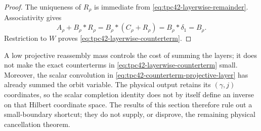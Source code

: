\begin{proof}
The uniqueness of \(R_\rho\) is immediate from
\eqref{eq:tpc42-layerwise-remainder}.  Associativity gives
\[
 A_\rho+B_\rho*R_\rho
 =B_\rho*(C_\rho+R_\rho)
 =B_\rho*\delta_1
 =B_\rho.
\]
Restriction to \(W\) proves
\eqref{eq:tpc42-layerwise-counterterm}.
\end{proof}

A low projective reassembly mass controls the cost of summing the layers;
it does not make the exact counterterms in
\eqref{eq:tpc42-layerwise-counterterm} small.  Moreover, the scalar
convolution in \eqref{eq:tpc42-counterterm-projective-layer} has already
summed the orbit variable.  The physical output retains its
\((\gamma,j)\) coordinates, so the scalar completion identity does not by
itself define an inverse on that Hilbert coordinate space.  The results of
this section therefore rule out a small-boundary shortcut; they do not
supply, or disprove, the remaining physical cancellation theorem.
